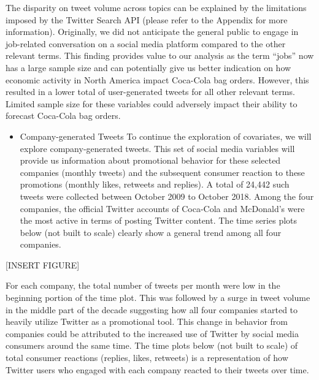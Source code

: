 \documentclass[12pt,oneside]{chicagocapstone}
\providecommand{\tightlist}{%
  \setlength{\itemsep}{0pt}\setlength{\parskip}{0pt}}
\begin{document}
The disparity on tweet volume across topics can be explained by the
limitations imposed by the Twitter Search API (please refer to the
Appendix for more information). Originally, we did not anticipate the
general public to engage in job-related conversation on a social media
platform compared to the other relevant terms. This finding provides
value to our analysis as the term ``jobs'' now has a large sample size
and can potentially give us better indication on how economic activity
in North America impact Coca-Cola bag orders. However, this resulted in
a lower total of user-generated tweets for all other relevant terms.
Limited sample size for these variables could adversely impact their
ability to forecast Coca-Cola bag orders.
\begin{itemize}
\tightlist
\item
  Company-generated Tweets To continue the exploration of covariates, we
  will explore company-generated tweets. This set of social media
  variables will provide us information about promotional behavior for
  these selected companies (monthly tweets) and the subsequent consumer
  reaction to these promotions (monthly likes, retweets and replies). A
  total of 24,442 such tweets were collected between October 2009 to
  October 2018. Among the four companies, the official Twitter accounts
  of Coca-Cola and McDonald's were the most active in terms of posting
  Twitter content. The time series plots below (not built to scale)
  clearly show a general trend among all four companies.
\end{itemize}
{[}INSERT FIGURE{]}

For each company, the total number of tweets per month were low in the
beginning portion of the time plot. This was followed by a surge in
tweet volume in the middle part of the decade suggesting how all four
companies started to heavily utilize Twitter as a promotional tool. This
change in behavior from companies could be attributed to the increased
use of Twitter by social media consumers around the same time. The time
plots below (not built to scale) of total consumer reactions (replies,
likes, retweets) is a representation of how Twitter users who engaged
with each company reacted to their tweets over time.
\end{document}
